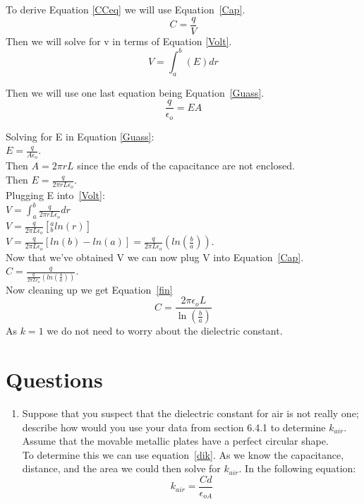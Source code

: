 \documentclass[10pt]{article}
\begin{document}
To derive Equation \ref{CCeq} we will use Equation~\ref{Cap}.\\
\begin{equation}\label{Cap}
  C = \frac{q}{V}
\end{equation}
Then we will solve for v in terms of Equation \ref{Volt}.\\
\begin{equation}\label{Volt}
  V = \int_{a}^{b}(E)dr
\end{equation}

Then we will use one last equation being Equation~\ref{Guass}.\\
\begin{equation}\label{Guass}
  \frac{q}{\epsilon_{o}} = EA
\end{equation}

Solving for E in Equation \ref{Guass}:\\
$E = \frac{q}{A\epsilon_{o}}$.\\
Then $A = 2\pi rL$ since the ends of the capacitance are not enclosed.\\
Then $E = \frac{q}{2\pi rL\epsilon_{o}}$.\\
Plugging E into~\ref{Volt}:\\
$V = \int_{a}^{b}\frac{q}{2\pi rL\epsilon_{o}} dr$\\
$V = \frac{q}{2\pi L\epsilon_{o}} [_{b}^{a}ln(r)]$\\
$V = \frac{q}{2\pi L\epsilon_{o}} [ln(b) - ln(a)] = \frac{q}{2\pi L\epsilon_{o}} (ln(\frac{b}{a}))$.\\
Now that we've obtained V we can now plug V into Equation~\ref{Cap}.\\
$C = \frac{q}{\frac{q}{2\pi L\epsilon_{o}} (ln(\frac{b}{a}))}$.\\
Now cleaning up we get Equation~\ref{fin}\\
\begin{equation}\label{fin}
  C = \frac{2\pi\epsilon_{o}L}{\ln(\frac{b}{a})}
\end{equation}
As $k = 1$ we do not need to worry about the dielectric constant.\\

\section{Questions}
\begin{enumerate}
  \item Suppose that you suspect that the dielectric constant for air is not really one; describe how
  would you use your data from section 6.4.1 to determine $k_{air}$. Assume that the movable
  metallic plates have a perfect circular shape.\\

  To determine this we can use equation~\ref{dik}. As we know the capacitance, distance, and the area
  we could then solve for $k_{air}$. In the following equation:
  \begin{equation}
    k_{air} = \frac{Cd}{\epsilon_{oA}}
  \end{equation}
\end{enumerate}
\end{document}
